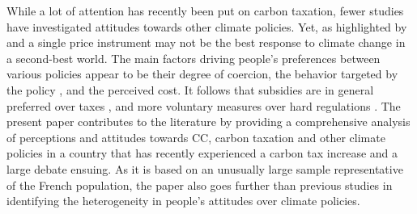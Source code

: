 \documentclass[english,5p,authoryear]{elsarticle}
\begin{document}
While a lot of attention has recently been put on carbon taxation, fewer studies have investigated attitudes towards other climate policies. Yet, as highlighted by \citet{stern_report_2017} and \citet{stiglitz_addressing_2019} a single price instrument may not be the best response to climate change in a second-best world. The main factors driving people's preferences between various policies appear to be their degree of coercion, the behavior targeted by the policy \citep{de_groot_schuitema_2012}, and the perceived cost. It follows that subsidies are in general preferred over taxes \citep[e.g.][]{tobler_et_al_2012,cherry_accepting_2017}, and more voluntary measures over hard regulations \citep{attari_et_al_2009}. The present paper contributes to the literature by providing a comprehensive analysis of perceptions and attitudes towards CC, carbon taxation and other climate policies in a country that has recently experienced a carbon tax increase and a large debate ensuing. As it is based on an unusually large sample representative of the French population, the paper also goes further than previous studies in identifying the heterogeneity in people's attitudes over climate policies. %


\end{document}
